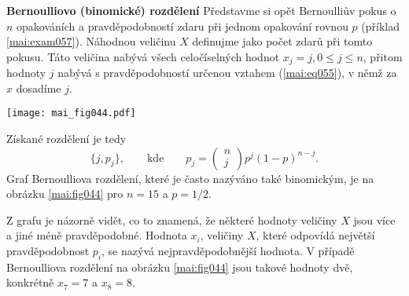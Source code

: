 \wikitextrule
\begin{example}\label{mai:exam065}
  \textbf{Bernoulliovo (binomické) rozdělení}\newline\small
  Představme si opět Bernoulliův pokus o \(n\) opakováních a pravděpodobností zdaru při jednom 
  opakování rovnou \(p\) (příklad \ref{mai:exam057}). Náhodnou veličinu \(X\) definujme jako počet 
  zdarů při tomto pokusu. Táto veličina nabývá všech celočíselných hodnot \(x_j = j, 0 \leq j \leq 
  n\), přitom hodnoty \(j\) nabývá s pravděpodobností určenou vztahem (\ref{mai:eq055}), v němž za 
  \(x\) dosadíme \(j\). 
  
  {\centering
   \captionsetup{type=figure}
   \texttt{[image: mai\_fig044.pdf]}
  \par}
  
  Získané rozdělení je tedy
  \begin{equation*}
    \lbrace j,p_j\rbrace, \qquad\text{kde}\qquad p_j = 
      \begin{pmatrix} n \\ j \end{pmatrix}p^j(1 - p)^{n-j}.
  \end{equation*}
  Graf Bernoulliova rozdělení, které je často nazýváno také binomickým, je na obrázku 
  \ref{mai:fig044} pro \(n = 15\) a \(p = 1/2\).
  
  Z grafu je názorně vidět, co to znamená, že některé hodnoty veličiny \(X\) jsou více a jiné méně 
  pravděpodobné. Hodnota \(x_i\), veličiny \(X\), které odpovídá největší pravděpodobnost \(p_i\), 
  se nazývá nejpravděpodobnější hodnota. V případě Bernoulliova rozdělení na obrázku 
  \ref{mai:fig044} jsou takové hodnoty dvě, konkrétně \(x_7 = 7\) a \(x_8 = 8\).
\normalsize
\end{example}